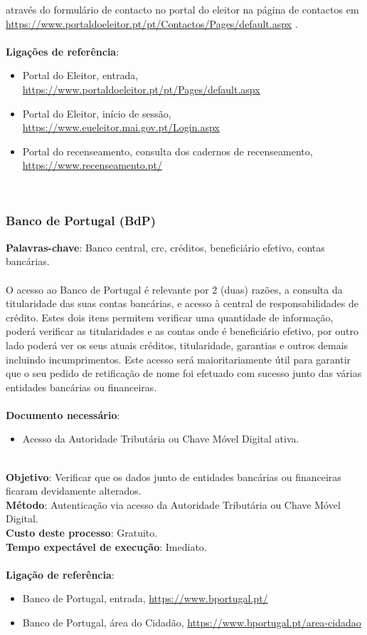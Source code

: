 através do formulário de contacto no portal do eleitor na página de
contactos em \url{https://www.portaldoeleitor.pt/pt/Contactos/Pages/default.aspx} . \\
\\
\textbf{Ligações de referência}:
\begin{itemize}
	\item Portal do Eleitor, entrada, \url{https://www.portaldoeleitor.pt/pt/Pages/default.aspx}
	\item Portal do Eleitor, início de sessão, \url{https://www.eueleitor.mai.gov.pt/Login.aspx}
	\item Portal do recenseamento, consulta dos cadernos de recenseamento, \url{https://www.recenseamento.pt/}
\end{itemize}
\leavevmode\\
\subsubsection{Banco de Portugal (BdP)}

\textbf{Palavras-chave}: Banco central, crc, créditos, beneficiário efetivo, contas bancárias. \\
\\
O acesso ao Banco de Portugal é relevante por 2 (duas) razões, a
consulta da titularidade das suas contas bancárias, e acesso à central
de responsabilidades de crédito. Estes dois itens permitem verificar uma
quantidade de informação, poderá verificar as titularidades e as contas
onde é beneficiário efetivo, por outro lado poderá ver os seus atuais
créditos, titularidade, garantias e outros demais incluindo
incumprimentos. Este acesso será maioritariamente útil para garantir que
o seu pedido de retificação de nome foi efetuado com sucesso junto das
várias entidades bancárias ou financeiras. \\
\\
\textbf{Documento necessário}:
\begin{itemize}
	\item Acesso da Autoridade Tributária ou Chave Móvel Digital ativa.
\end{itemize}
\leavevmode\\
\textbf{Objetivo}: Verificar que os dados junto de entidades bancárias ou financeiras ficaram devidamente alterados. \\
\textbf{Método}: Autenticação via acesso da Autoridade Tributária ou Chave Móvel Digital. \\
\textbf{Custo deste processo}: Gratuito. \\
\textbf{Tempo expectável de	execução}: Imediato. \\
\\
\textbf{Ligação de referência}:
\begin{itemize}
	\item Banco de Portugal, entrada, \url{https://www.bportugal.pt/}
	\item Banco de Portugal, área do Cidadão, \url{https://www.bportugal.pt/area-cidadao}
\end{itemize}

